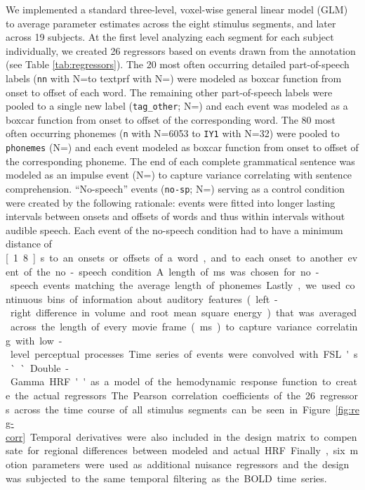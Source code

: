 \documentclass[10pt,a4paper,onecolumn]{article}
\begin{document}
We implemented a standard three-level, voxel-wise general linear model (GLM) to
average parameter estimates across the eight stimulus segments, and later across
19 subjects.
At the first level analyzing each segment for each subject individually, we
created 26 regressors based on events drawn from the annotation (see Table
\ref{tab:regressors}).
The 20 most often occurring detailed part-of-speech labels (\texttt{nn} with
N=\rNnAll\space to text{prf} with N=\rPrfAll) were modeled as boxcar function
from onset to offset of each word.
The remaining other part-of-speech labels were pooled to a single new label
(\texttt{tag\_other}; N=\rTagotherAll) and each event was modeled as a boxcar
function from onset to offset of the corresponding word.
The 80 most often occurring phonemes (\texttt{n} with N=6053 to \texttt{IY1}
with N=32) were pooled to \texttt{phonemes} (N=\rPhonesAll) and each event
modeled as boxcar function from onset to offset of the corresponding phoneme.
The end of each complete grammatical sentence was modeled as an impulse event
(N=\rSentenceAll) to capture variance correlating with sentence comprehension.
``No-speech'' events (\texttt{no-sp}; N=\rNospAll) serving as a control
condition were created by the following rationale: events were fitted into
longer lasting intervals between onsets and offsets of words and thus within
intervals without audible speech.
Each event of the no-speech condition had to have a minimum distance of
\unit[1.8]{s} to an onsets or offsets of a word, and to each onset to another
event of the no-speech condition.
A length of \unit[70]{ms} was chosen for no-speech events matching the average
length of phonemes.
Lastly, we used continuous bins of information about auditory features
(left-right difference in volume and root mean square energy) that was averaged
across the length of every movie frame (\unit[40]{ms}) to capture variance
correlating with low-level perceptual processes.
Time series of events were convolved with FSL's ``Double-Gamma HRF'' as a model
of the hemodynamic response function to create the actual regressors.
The Pearson correlation coefficients of the 26 regressors across the time course
of all stimulus segments can be seen in Figure \ref{fig:reg-corr}.
Temporal derivatives were also included in the design matrix to compensate for
regional differences between modeled and actual HRF.
Finally, six motion parameters were used as additional nuisance regressors and
the design was subjected to the same temporal filtering as the BOLD time series.
\end{document}
